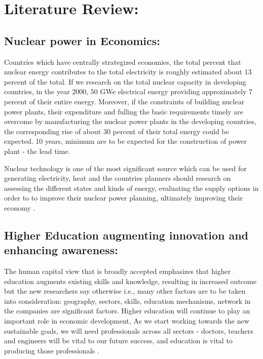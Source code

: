 \documentclass[]{article}
\begin{document}
\section{Literature Review:}

\subsection{Nuclear power in Economics:}

Countries which have centrally strategized economies, the total percent that nuclear energy contributes to the total electricity is roughly estimated about 13 percent of the total. If we research on the total nuclear capacity in developing countries, in the year 2000, 50 GWe electrical energy providing approximately 7 percent of their entire energy. Moreover, if the constraints of building nuclear power plants, their expenditure and fulling the basic requirements timely are overcome by manufacturing the nuclear power plants in the developing countries, the corresponding rise of about 30 percent of their total energy could be expected. 10 years, minimum are to be expected for the construction of power plant - the lead time.

Nuclear technology is one of the most significant source which can be used for generating electricity, heat and the countries planners should research on assessing the different states and kinds of energy, evaluating the supply options in order to to improve their nuclear power planning, ultimately improving their economy \cite{Hj03}.

\subsection{Higher Education augmenting innovation and enhancing awareness:}

The human capital view that is broadly accepted emphasizes that higher education augments existing skills and knowledge, resulting in increased outcome but the new researchers say otherwise i.e., many other factors are to be taken into consideration: geography, sectors, skills, education mechanisms, network in the companies are significant factors.
Higher education will continue to play an important role in economic development, As we start working towards the new sustainable goals, we will need professionals across all sectors - doctors, teachers and engineers will be vital to our future success, and education is vital to producing those professionals \cite{Hig15}. 
\end{document}
